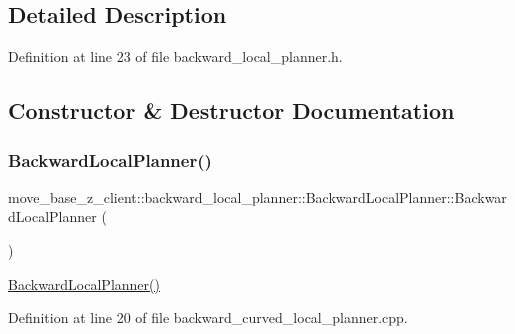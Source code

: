 \subsection{Detailed Description}


Definition at line 23 of file backward\+\_\+local\+\_\+planner.\+h.



\subsection{Constructor \& Destructor Documentation}
\mbox{\label{classmove__base__z__client_1_1backward__local__planner_1_1BackwardLocalPlanner_a9de6ad61e5c2ec81c6e4842778268457}} 
\subsubsection{\texorpdfstring{Backward\+Local\+Planner()}{BackwardLocalPlanner()}}
{\footnotesize\ttfamily move\+\_\+base\+\_\+z\+\_\+client\+::backward\+\_\+local\+\_\+planner\+::\+Backward\+Local\+Planner\+::\+Backward\+Local\+Planner (\begin{DoxyParamCaption}{ }\end{DoxyParamCaption})}

\hyperlink{classmove__base__z__client_1_1backward__local__planner_1_1BackwardLocalPlanner_a9de6ad61e5c2ec81c6e4842778268457}{Backward\+Local\+Planner()} 

Definition at line 20 of file backward\+\_\+curved\+\_\+local\+\_\+planner.\+cpp.


